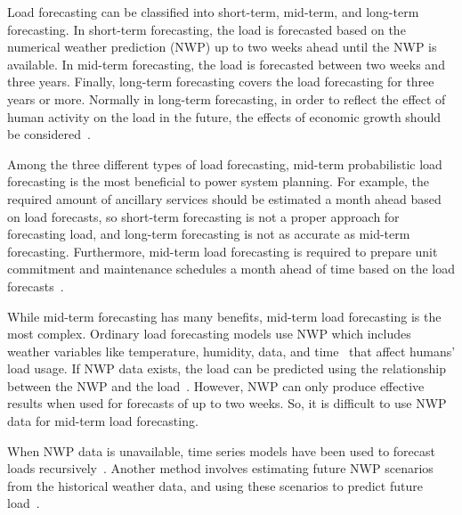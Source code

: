 \documentclass[journal]{IEEEtran} %
\begin{document}
Load forecasting can be classified into short-term, mid-term, and long-term forecasting. In short-term forecasting, the load is forecasted based on the numerical weather prediction (NWP) up to two weeks ahead until the NWP is available. In mid-term forecasting, the load is forecasted between two weeks and three years. Finally, long-term forecasting covers the load forecasting for three years or more. Normally in long-term forecasting, in order to reflect the effect of human activity on the load in the future, the effects of economic growth should be considered~\cite{Tao2014}. 


Among the three different types of load forecasting, mid-term probabilistic load forecasting is the most beneficial to power system planning. For example, the required amount of ancillary services should be estimated a month ahead based on load forecasts, so short-term forecasting is not a proper approach for forecasting load, and long-term forecasting is not as accurate as mid-term forecasting. Furthermore, mid-term load forecasting is required to prepare unit commitment and maintenance schedules a month ahead of time based on the load forecasts~\cite{burger2014managing}.


While mid-term forecasting has many benefits, mid-term load forecasting is the most complex. Ordinary load forecasting models use NWP which includes weather variables like temperature, humidity, data, and time~\cite{xie2016temperature} that affect humans' load usage. If NWP data exists, the load can be predicted using the relationship between the NWP and the load~\cite{bacher2013short}. However, NWP can only produce effective results when used for forecasts of up to two weeks. So, it is difficult to use NWP data for mid-term load forecasting. 

When NWP data is unavailable, time series models have been used to forecast loads recursively~\cite{TIMESERIES}. Another method involves estimating future NWP scenarios from the historical weather data, and using these scenarios to predict future load~\cite{xie2016temperature}. 
\end{document}

